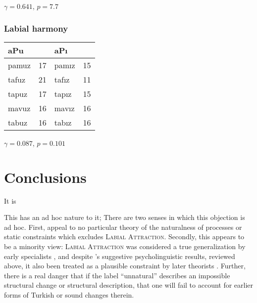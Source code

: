 $\gamma = 0.641$, $p = 7.7$


\subsubsection{Labial harmony}

\begin{example}
\begin{tabular}{l r l r}
\toprule
\multicolumn{2}{l}{aPu} & \multicolumn{2}{l}{aPı} \\
\midrule
pamuz & 17              & pamız & 15 \\
tafuz & 21              & tafız & 11 \\
tapuz & 17              & tapız & 15 \\
mavuz & 16              & mavız & 16 \\
tabuz & 16              & tabız & 16 \\
\bottomrule
\end{tabular}
\end{example}

$\gamma = 0.087$, $p = 0.101$

\section{Conclusions}

\citet{Becker2011}

It is 

This has an ad hoc nature to it; 
There are two senses in which this objection is ad hoc. 
First, \citeauthor{Becker2011} appeal to no particular theory of the naturalness of processes or static constraints which excludes \textsc{Labial Attraction}. 
Secondly, this appears to be a minority view: \textsc{Labial Attraction} was considered a true generalization by early specialists
\citep[e.g.,][]{Lees1966a}, and despite \citeauthor{Zimmer1969}'s suggestive psycholinguistic results, reviewed above, it also been treated as a plausible constraint by later theorists \citep[e.g.,][]{NiChiosain1993,Ito1993,Ito1995a,Zuraw2000}.
Further, there is a real danger that if the label ``unnatural'' 
describes an impossible structural change or structural description, that one will fail to account for earlier forms of Turkish or sound changes therein.

